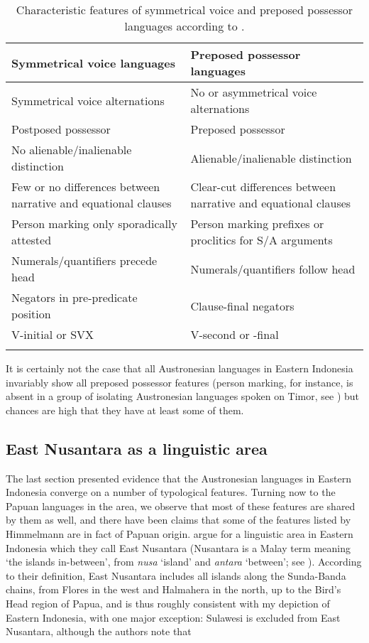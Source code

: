 \begin{table}[ht]
	\small
\begin{tabularx}{\textwidth}{QQ}
\lsptoprule
Symmetrical voice languages & Preposed possessor languages \tabularnewline
\midrule
Symmetrical voice alternations & No or asymmetrical voice alternations \tabularnewline
\tablevspace
Postposed possessor & Preposed possessor \tabularnewline
\tablevspace
No alienable/inalienable distinction & Alienable/inalienable distinction \tabularnewline
\tablevspace
Few or no differences between narrative and equational clauses & Clear-cut differences between narrative and equational clauses \tabularnewline
\tablevspace
Person marking only sporadically attested & Person marking prefixes or proclitics for S/A arguments \tabularnewline
\tablevspace
Numerals/quantifiers precede head & Numerals/quantifiers follow head \tabularnewline
\tablevspace
Negators in pre-predicate position & Clause-final negators \tabularnewline
\tablevspace
V-initial or SVX & V-second or -final \tabularnewline
\lspbottomrule
\end{tabularx}
\caption[Characteristic features of symmetrical voice and preposed possessor languages]{Characteristic features of symmetrical voice and preposed possessor languages according to \citet[175]{Himmelmann2005austronesian}.}
\label{table:sympre}
\end{table}

It is certainly not the case that all Austronesian languages in Eastern Indonesia invariably show all preposed possessor features (person marking, for instance, is absent in a group of isolating Austronesian languages spoken on Timor, see \citealt[175]{Himmelmann2005austronesian}) but chances are high that they have at least some of them. 

\subsection{East Nusantara as a linguistic area}\label{sec:nusantara}

The last section presented evidence that the Austronesian languages in Eastern Indonesia converge on a number of typological features. Turning now to the Papuan languages in the area, we observe that most of these features are shared by them as well, and there have been claims that some of the features listed by Himmelmann are in fact of Papuan origin. \citet{klamer2008east} argue for a linguistic area in Eastern Indonesia which they call East Nusantara (Nusantara is a Malay term meaning `the islands in-between', from \textit{nusa} `island' and \textit{antara} `between'; see \citealt[99]{klamer2008east}). According to their definition, East Nusantara includes all islands along the Sunda-Banda chains, from Flores in the west and Halmahera in the north, up to the Bird's Head region of  Papua, and is thus roughly consistent with my depiction of Eastern Indonesia, with one major exception: Sulawesi is excluded from East Nusantara, although the authors note that 


